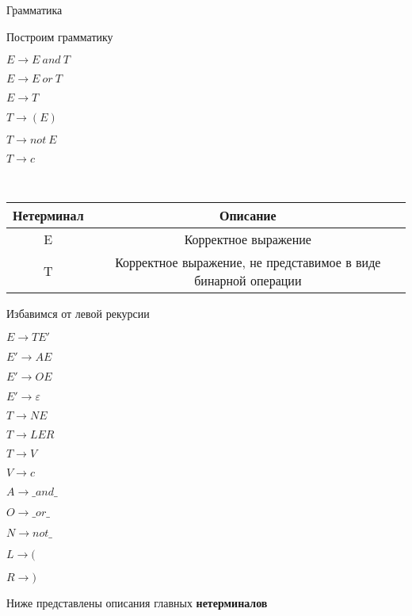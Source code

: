 \begin{para}{Грамматика}

Построим грамматику

$E \rightarrow E \: and \: T$

$E \rightarrow E \: or \: T$

$E \rightarrow T$

$T \rightarrow (E)$

$T \rightarrow not \: E$

$T \rightarrow c$

~\

\begin{table}[h]

\begin{center}

\begin{tabular}{|c|c|}
\hline
\textbf{Нетерминал} & \textbf{Описание}\\
\hline
E & Корректное выражение\\
\hline
T & Корректное выражение, не представимое в виде бинарной операции\\
\hline

\end{tabular}

\end{center}

\end{table}

Избавимся от левой рекурсии

$E \rightarrow T E'$

$E' \rightarrow A E$

$E' \rightarrow O E$

$E' \rightarrow \varepsilon$

$T \rightarrow N E$

$T \rightarrow LER$

$T \rightarrow V$

$V \rightarrow c$

$A \rightarrow \_and\_$

$O \rightarrow \_or\_$

$N \rightarrow not\_$

$L \rightarrow ($

$R \rightarrow )$

Ниже представлены описания главных \textbf{нетерминалов}

\begin{table}[h]

\begin{center}


\end{center}
\end{table}
\end{para}
